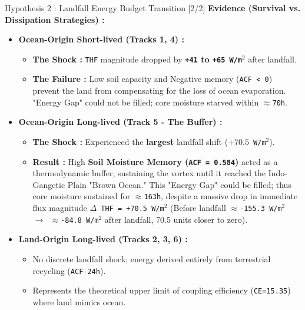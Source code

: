 \documentclass[8pt, aspectratio=169]{beamer}
\begin{document}
\begin{frame}{Hypothesis 2 : Landfall Energy Budget Transition [2/2]}
    \footnotesize
    \textbf{Evidence (Survival vs. Dissipation Strategies) :}
    \begin{itemize}
        \item \textbf{Ocean-Origin Short-lived (Tracks 1, 4) :}
            \begin{itemize}\footnotesize
                \item \textbf{The Shock :} \texttt{THF} magnitude dropped by \textbf{\texttt{+41} to \texttt{+65 W/m$^2$}} after landfall. \cite{nair2011influence}
                \item \textbf{The Failure :} Low soil capacity and Negative memory (\texttt{ACF < 0}) prevent the land from compensating for the loss of ocean evaporation. "Energy Gap" could not be filled; core moisture starved within \texttt{$\approx$70h}.
            \end{itemize}
        \item \textbf{Ocean-Origin Long-lived (Track 5 - The Buffer) :}
            \begin{itemize}\footnotesize
                \item \textbf{The Shock :} Experienced the \textbf{largest} landfall shift (\texttt{$+70.5$ W/m$^2$}).
            \item \textbf{Result :} High \textbf{Soil Moisture Memory (\texttt{ACF = 0.584})} acted as a thermodynamic buffer, sustaining the vortex until it reached the Indo-Gangetic Plain "Brown Ocean." This "Energy Gap" could be filled; thus core moisture sustained for \texttt{$\approx$163h}, despite a massive drop in immediate flux magnitude \texttt{$\Delta$ THF = +70.5 W/m$^2$} (Before landfall \texttt{$\approx$-155.3  W/m$^2$ $\rightarrow$ $\approx$-84.8 W/m$^2$} after landfall, \scriptsize 70.5 units closer to zero\footnotesize). \cite{nair2011influence}
            \end{itemize}
        \item \textbf{Land-Origin Long-lived (Tracks 2, 3, 6) :}
            \begin{itemize}\footnotesize
                \item No discrete landfall shock; energy derived entirely from terrestrial recycling (\texttt{ACF-24h}). \cite{chang2009}
                \item Represents the theoretical upper limit of coupling efficiency (\texttt{CE=15.35}) where land mimics ocean. \cite{hunt2017effect}
            \end{itemize}
    \end{itemize}


\end{frame}
\end{document}
